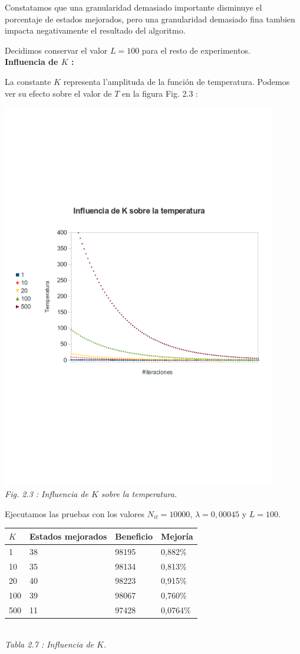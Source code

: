 \documentclass{article}
\begin{document}
Constatamos que una granularidad demasiado importante disminuye el porcentaje de
estados mejorados, pero una granularidad demasiado fina tambien impacta
negativamente el resultado del algoritmo.

Decidimos conservar el valor $L=100$ para el resto de experimentos.\\

\textbf{Influencia de $K$ : }

La constante $K$ representa l'amplituda de la función de temperatura.
Podemos ver su efecto sobre el valor de $T$ en la figura Fig. 2.3 :
\begin{center}
\includegraphics[width=12cm]{K}\\
{\it Fig. 2.3 : Influencia de $K$ sobre la temperatura.}
\end{center}

Ejecutamos las pruebas con los valores $N_{it} = 10 000$, $\lambda = 0,00045$ y
$L=100$.

\begin{center}
\begin{tabular}{|l||l|l|l|}
\hline
$K$ & Estados mejorados & Beneficio & Mejoría\\
\hline
1 & 38 & 98195 & 0,882\%\\
\hline
10 & 35 & 98134 & 0,813\%\\
\hline
20 & 40 & 98223 & 0,915\%\\
\hline
100 & 39 & 98067 & 0,760\%\\
\hline
500 & 11 & 97428 & 0,0764\%\\
\hline
\end{tabular}\\
{\it Tabla 2.7 : Influencia de $K$.}
\end{center}
\end{document}
